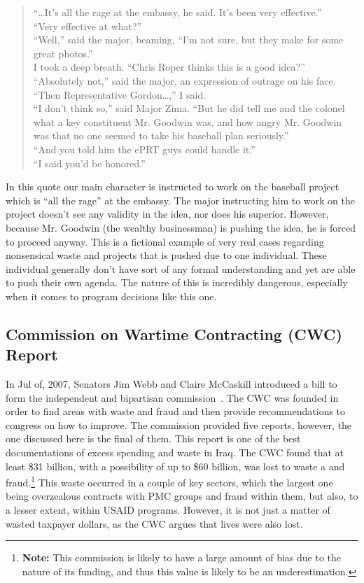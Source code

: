 \documentclass[12pt, twoside]{article}
\begin{document}
        \begin{quotation}
            “\ldots It's all the rage at the embassy, he said. It's been very effective.” \\
            “Very effective at what?” \\
            “Well,” said the major, beaming, “I'm not sure, but they make for some great photos.” \\
            I took a deep breath. “Chris Roper thinks this is a good idea?” \\
            “Absolutely not,” said the major, an expression of outrage on his face. \\
            “Then Representative Gordon…,” I said. \\
            “I don't think so,” said Major Zima. “But he did tell me and the colonel what a key constituent Mr. Goodwin was, and how angry Mr. Goodwin was that no one seemed to take his baseball plan seriously.” \\
            “And you told him the ePRT guys could handle it.” \\
            “I said you'd be honored.” \parencite{Klay2014}
        \end{quotation}

        In this quote our main character is instructed to work on the baseball project which is ``all the rage'' at the embassy. The major instructing him to work on the project doesn't see any validity in the idea, nor does his superior. However, because Mr. Goodwin (the wealthy businessman) is pushing the idea, he is forced to proceed anyway. This is a fictional example of very real cases regarding nonsensical waste and projects that is pushed due to one individual. These individual generally don't have sort of any formal understanding and yet are able to push their own agenda. The nature of this is incredibly dangerous, especially when it comes to program decisions like this one. 
        
    \subsection{Commission on Wartime Contracting (CWC) Report}
        In Jul of, 2007, Senators Jim Webb and Claire McCaskill introduced a bill to form the independent and bipartisan commission~\cite{CWC_2011}. The CWC was founded in order to find areas with waste and fraud and then provide recommendations to congress on how to improve. The commission provided five reports, however, the one discussed here is the final of them. This report is one of the best documentations of excess spending and waste in Iraq. The CWC found that at least \$31 billion, with a possibility of up to \$60 billion, was lost to waste a and fraud.\footnote{\textbf{Note:} This commission is likely to have a large amount of bias due to the nature of its funding, and thus this value is likely to be an underestimation.} 
        This waste occurred in a couple of key sectors, which the largest one being overzealous contracts with PMC groups and fraud within them, but also, to a lesser extent, within USAID programs. However, it is not just a matter of wasted taxpayer dollars, as the CWC argues that lives were also lost. 
        
\end{document}
